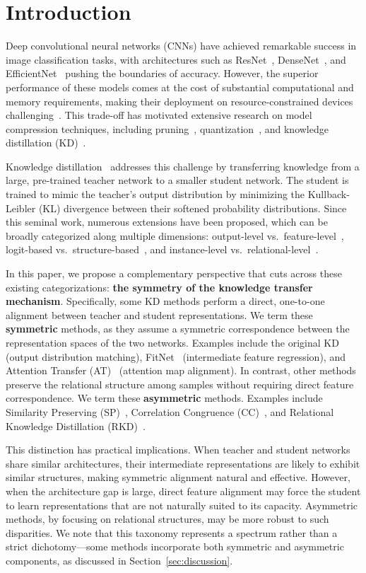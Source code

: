 \documentclass[symmetry,article,submit,pdftex,moreauthors]{Definitions/mdpi}
\begin{document}
\section{Introduction}

Deep convolutional neural networks (CNNs) have achieved remarkable success in image classification tasks, with architectures such as ResNet~\cite{ref1}, DenseNet~\cite{ref2}, and EfficientNet~\cite{ref3} pushing the boundaries of accuracy. However, the superior performance of these models comes at the cost of substantial computational and memory requirements, making their deployment on resource-constrained devices challenging~\cite{ref4}. This trade-off has motivated extensive research on model compression techniques, including pruning~\cite{ref5}, quantization~\cite{ref6}, and knowledge distillation (KD)~\cite{ref7}.

Knowledge distillation~\cite{ref7} addresses this challenge by transferring knowledge from a large, pre-trained teacher network to a smaller student network. The student is trained to mimic the teacher's output distribution by minimizing the Kullback-Leibler (KL) divergence between their softened probability distributions. Since this seminal work, numerous extensions have been proposed, which can be broadly categorized along multiple dimensions: output-level vs.~feature-level~\cite{ref8,ref9}, logit-based vs.~structure-based~\cite{ref10,ref11}, and instance-level vs.~relational-level~\cite{ref12}.

In this paper, we propose a complementary perspective that cuts across these existing categorizations: \textbf{the symmetry of the knowledge transfer mechanism}. Specifically, some KD methods perform a direct, one-to-one alignment between teacher and student representations. We term these \textbf{symmetric} methods, as they assume a symmetric correspondence between the representation spaces of the two networks. Examples include the original KD (output distribution matching), FitNet~\cite{ref8} (intermediate feature regression), and Attention Transfer (AT)~\cite{ref9} (attention map alignment). In contrast, other methods preserve the relational structure among samples without requiring direct feature correspondence. We term these \textbf{asymmetric} methods. Examples include Similarity Preserving (SP)~\cite{ref10}, Correlation Congruence (CC)~\cite{ref11}, and Relational Knowledge Distillation (RKD)~\cite{ref12}.

This distinction has practical implications. When teacher and student networks share similar architectures, their intermediate representations are likely to exhibit similar structures, making symmetric alignment natural and effective. However, when the architecture gap is large, direct feature alignment may force the student to learn representations that are not naturally suited to its capacity. Asymmetric methods, by focusing on relational structures, may be more robust to such disparities. We note that this taxonomy represents a spectrum rather than a strict dichotomy---some methods incorporate both symmetric and asymmetric components, as discussed in Section~\ref{sec:discussion}.
\end{document}

